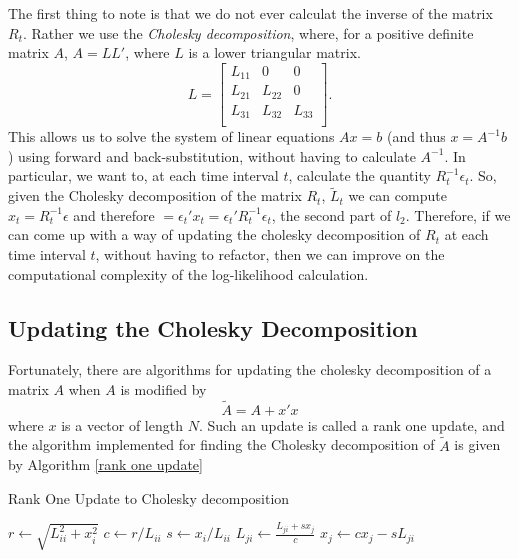 \documentclass{article} %
\numberwithin{equation}{section} %
\numberwithin{figure}{section} %
\numberwithin{table}{section} %
\begin{document}
The first thing to note is that we do not ever calculat the inverse of the matrix $R_t$. Rather we use the \textit{Cholesky decomposition}, where, for a positive definite matrix $A$, $A = LL'$, where $L$ is a lower triangular matrix.
\begin{equation}
  L=
    \begin{bmatrix}
      L_{11} & 0      & 0       \\
      L_{21} & L_{22} & 0       \\
      L_{31} & L_{32} & L_{33}  \\
    \end{bmatrix}.
\end{equation}
This allows us to solve the system of linear equations $Ax = b$ (and thus $x = A^{-1}b$) using forward and back-substitution, without having to calculate $A^{-1}$. In particular, we want to, at each time interval $t$, calculate the quantity $R_t^{-1}\epsilon_t$. So, given the Cholesky decomposition of the matrix $R_t$, $\tilde{L}_t$ we can compute $x_t = R_t^{-1}\epsilon$ and therefore $ = \epsilon_t'x_t = \epsilon_t'R_t^{-1}\epsilon_t$, the second part of $l_2$. Therefore, if we can come up with a way of updating the cholesky decomposition of $R_t$ at each time interval $t$, without having to refactor, then we can improve on the computational complexity of the log-likelihood calculation.

\subsection{Updating the Cholesky Decomposition}

Fortunately, there are algorithms for updating the cholesky decomposition of a matrix $A$ when $A$ is modified by
\begin{equation}
\tilde{A} = A + x'x
\end{equation}
where $x$ is a vector of length $N$. Such an update is called a rank one update, and the algorithm implemented for finding the Cholesky decomposition of $\tilde{A}$ is given by Algorithm \ref{rank one update}

\begin{algorithm}
\caption{Rank One Update to Cholesky decomposition}\label{rank one update}
\begin{algorithmic}[1]
\State $r \gets \sqrt{L_{ii}^2 + x_i^2}$
\State $c \gets r / L_{ii}$
\State $s \gets x_i/L_{ii}$
\State $L_{ji} \gets \frac{L_{ji} + sx_{j}}{c}$
\State $x_j \gets c x_j - sL_{ji}$
\EndFor
\EndFor
\EndProcedure
\end{algorithmic}
\end{algorithm}
\end{document}
